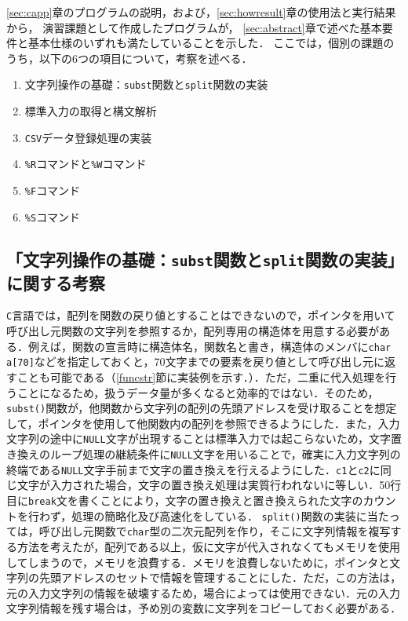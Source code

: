 \ref{sec:capp}章のプログラムの説明，および，\ref{sec:howresult}章の使用法と実行結果から，
演習課題として作成したプログラムが，
\ref{sec:abstract}章で述べた基本要件と基本仕様のいずれも満たしていることを示した．
ここでは，個別の課題のうち，以下の6つの項目について，考察を述べる．

\begin{enumerate}
\setlength{\parskip}{2pt} \setlength{\itemsep}{2pt}
    \item 文字列操作の基礎：\texttt{subst}関数と\texttt{split}関数の実装
    \item 標準入力の取得と構文解析
    \item \texttt{CSV}データ登録処理の実装
    \item \texttt{\%R}コマンドと\texttt{\%W}コマンド
    \item \texttt{\%F}コマンド
    \item \texttt{\%S}コマンド
\end{enumerate}

\subsection{「文字列操作の基礎：\texttt{subst}関数と\texttt{split}関数の実装」に関する考察}

\verb|C|言語では，配列を関数の戻り値とすることはできないので，ポインタを用いて呼び出し元関数の文字列を参照するか，配列専用の構造体を用意する必要がある．例えば，関数の宣言時に構造体名，関数名と書き，構造体のメンバに\verb|char a[70]|などを指定しておくと，70文字までの要素を戻り値として呼び出し元に返すことも可能である（\ref{funcstr}節に実装例を示す．）．ただ，二重に代入処理を行うことになるため，扱うデータ量が多くなると効率的ではない．そのため，\verb|subst()|関数が，他関数から文字列の配列の先頭アドレスを受け取ることを想定して，ポインタを使用して他関数内の配列を参照できるようにした．また，入力文字列の途中に\verb|NULL|文字が出現することは標準入力では起こらないため，文字置き換えのループ処理の継続条件に\verb|NULL|文字を用いることで，確実に入力文字列の終端である\verb|NULL|文字手前まで文字の置き換えを行えるようにした．\verb|c1|と\verb|c2|に同じ文字が入力された場合，文字の置き換え処理は実質行われないに等しい．50行目に\verb|break|文を書くことにより，文字の置き換えと置き換えられた文字のカウントを行わず，処理の簡略化及び高速化をしている．
\verb|split()|関数の実装に当たっては，呼び出し元関数で\verb|char|型の二次元配列を作り，そこに文字列情報を複写する方法を考えたが，配列である以上，仮に文字が代入されなくてもメモリを使用してしまうので，メモリを浪費する．メモリを浪費しないために，ポインタと文字列の先頭アドレスのセットで情報を管理することにした．ただ，この方法は，元の入力文字列の情報を破壊するため，場合によっては使用できない．元の入力文字列情報を残す場合は，予め別の変数に文字列をコピーしておく必要がある．

